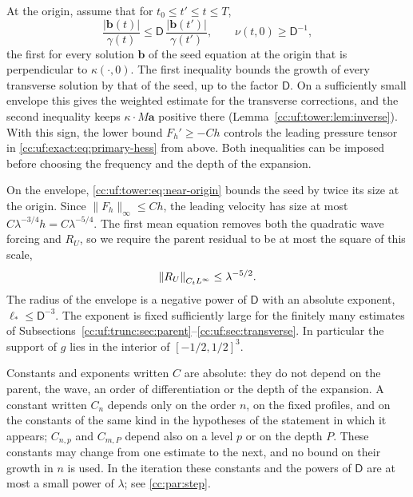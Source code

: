 At the origin, assume that for $t_0\le t'\le t\le T$,
\begin{equation}\label{cc:uf:tower:eq:wave-origin}
 \frac{|\mathbf b(t)|}{\gamma(t)}
 \le\mathsf D\,\frac{|\mathbf b(t')|}{\gamma(t')},\qquad
 \nu(t,0)\ge\mathsf D^{-1},
\end{equation}
the first for every solution $\mathbf b$ of the seed equation at the
origin that is perpendicular to $\kappa(\cdot,0)$. The first inequality
bounds the growth of every transverse solution by that of the seed,
up to the factor $\mathsf D$. On a sufficiently small envelope this
gives the weighted estimate for the transverse corrections, and the
second inequality keeps $\kappa\cdot M\mathbf a$ positive there
(Lemma~\ref{cc:uf:tower:lem:inverse}). With this sign, the lower bound
$F_h'\ge-Ch$ controls the leading pressure tensor in
\eqref{cc:uf:exact:eq:primary-hess} from above.
Both inequalities can be imposed before choosing the frequency and the
depth of the expansion.

On the envelope, \eqref{cc:uf:tower:eq:near-origin} bounds the seed
by twice its size at the origin. Since $\|F_h\|_\infty\le Ch$, the leading
velocity has size at most $C\lambda^{-3/4}h=C\lambda^{-5/4}$.
The first mean equation removes both the quadratic wave forcing and
$R_U$, so we require the parent residual to be at most the square of
this scale,
\begin{equation}\label{cc:uf:tower:eq:parent-small}
 \left\lVert R_U\right\rVert_{C_tL^\infty}\le\lambda^{-5/2}.
\end{equation}
The radius of the envelope is a negative power of $\mathsf D$ with an
absolute exponent, $\ell_*\le\mathsf D^{-3}$. The exponent is
fixed sufficiently large for the finitely many estimates of
Subsections~\ref{cc:uf:trunc:sec:parent}--\ref{cc:uf:sec:transverse}.
In particular the support of $g$ lies in the interior of
$[-1/2,1/2]^3$.

Constants and exponents written $C$ are absolute: they do not depend on
the parent, the wave, an order of differentiation or the depth of the
expansion. A constant written $C_n$ depends only on the order $n$, on
the fixed profiles, and on the constants of the same kind in the
hypotheses of the statement in which it appears; $C_{n,p}$ and $C_{m,P}$
depend also on a level $p$ or on the depth $P$. These constants may
change from one estimate to the next, and no bound on their growth in
$n$ is used. In the iteration these constants and the powers of
$\mathsf D$ are at most a small power of $\lambda$; see
\eqref{cc:par:step}.
